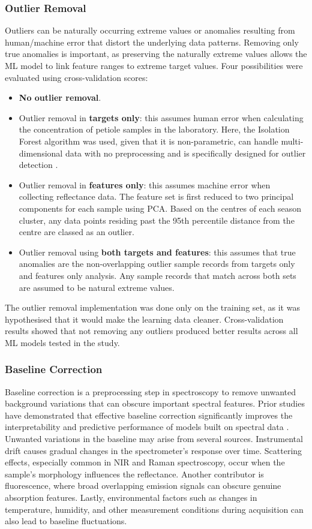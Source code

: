\documentclass[conference]{IEEEtran}
\begin{document}
\subsubsection{Outlier Removal}
Outliers can be naturally occurring extreme values or anomalies resulting from human/machine error that distort the underlying data patterns. Removing only true anomalies is important, as preserving the naturally extreme values allows the ML model to link feature ranges to extreme target values. Four possibilities were evaluated using cross-validation scores:
\begin{itemize}
    \item \textbf{No outlier removal}.
    \item Outlier removal in \textbf{targets only}: this assumes human error when calculating the concentration of petiole samples in the laboratory. Here, the Isolation Forest algorithm was used, given that it is non-parametric, can handle multi-dimensional data with no preprocessing and is specifically designed for outlier detection \cite{Liu2012}.
    \item Outlier removal in \textbf{features only}: this assumes machine error when collecting reflectance data. The feature set is first reduced to two principal components for each sample using PCA. Based on the centres of each season cluster, any data points residing past the 95th percentile distance from the centre are classed as an outlier.
    \item Outlier removal using \textbf{both targets and features}: this assumes that true anomalies are the non-overlapping outlier sample records from targets only and features only analysis. Any sample records that match across both sets are assumed to be natural extreme values.
\end{itemize}
The outlier removal implementation was done only on the training set, as it was hypothesised that it would make the learning data cleaner. Cross-validation results showed that not removing any outliers produced better results across all ML models tested in the study.

\subsubsection{Baseline Correction}
Baseline correction is a preprocessing step in spectroscopy to remove unwanted background variations that can obscure important spectral features. Prior studies have demonstrated that effective baseline correction significantly improves the interpretability and predictive performance of models built on spectral data \cite{Li2024, FengZhang2020, Eilers2005}. Unwanted variations in the baseline may arise from several sources. Instrumental drift causes gradual changes in the spectrometer’s response over time. Scattering effects, especially common in NIR and Raman spectroscopy, occur when the sample's morphology influences the reflectance. Another contributor is fluorescence, where broad overlapping emission signals can obscure genuine absorption features. Lastly, environmental factors such as changes in temperature, humidity, and other measurement conditions during acquisition can also lead to baseline fluctuations. 
\end{document}
